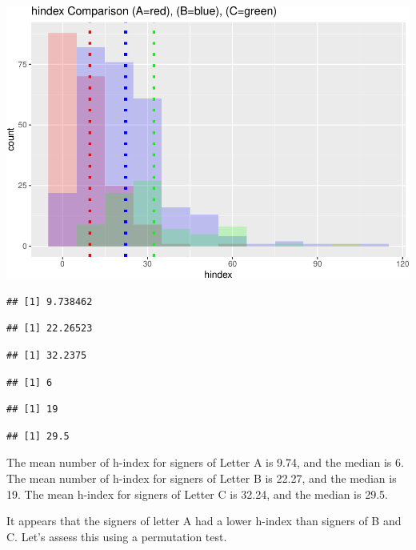 \documentclass[]{article}
\begin{document}
\includegraphics{final_files/figure-latex/unnamed-chunk-45-1.pdf}

\begin{verbatim}
## [1] 9.738462
\end{verbatim}

\begin{verbatim}
## [1] 22.26523
\end{verbatim}

\begin{verbatim}
## [1] 32.2375
\end{verbatim}

\begin{verbatim}
## [1] 6
\end{verbatim}

\begin{verbatim}
## [1] 19
\end{verbatim}

\begin{verbatim}
## [1] 29.5
\end{verbatim}

The mean number of h-index for signers of Letter A is 9.74, and the
median is 6. The mean number of h-index for signers of Letter B is
22.27, and the median is 19. The mean h-index for signers of Letter C is
32.24, and the median is 29.5.

It appears that the signers of letter A had a lower h-index than signers
of B and C. Let's assess this using a permutation test.
\end{document}
